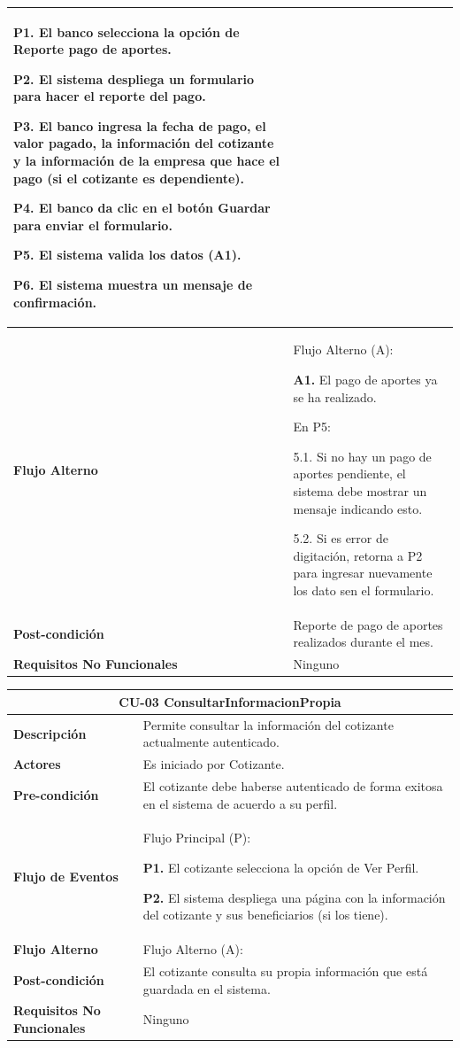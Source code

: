 \documentclass[12pt,a4paper]{article}
\begin{document}
\begin{center}
\begin{tabular}{|m{5.5cm}| m{9.5cm}|}
\textbf{P1.} El banco selecciona la opción de Reporte pago de aportes.

\textbf{P2.} El sistema despliega un formulario para hacer el reporte del pago.

\textbf{P3.} El banco ingresa la fecha de pago, el valor pagado, la información del cotizante y la información de la empresa que hace el pago (si el cotizante es dependiente).

\textbf{P4.} El banco da clic en el botón Guardar para enviar el formulario.

\textbf{P5.} El sistema valida los datos (A1).

\textbf{P6.} El sistema muestra un mensaje de confirmación.
\\
\hline 
\textbf{Flujo Alterno} &  Flujo Alterno (A):

\textbf{A1.} El pago de aportes ya se ha realizado.

	En P5:
	
	5.1. Si no hay un pago de aportes pendiente, el sistema debe mostrar un mensaje indicando esto.
	
	5.2. Si es error de digitación, retorna a P2 para ingresar nuevamente los dato sen el formulario. \\ 
\hline 
\textbf{Post-condición}  & Reporte de pago de aportes realizados durante el mes. \\ 
\hline 
\textbf{Requisitos No Funcionales} & Ninguno \\ 
\hline 
\end{tabular}
\vspace{5mm}

\begin{tabular}{|m{5.5cm}| m{9.5cm}|}
\hline 
\multicolumn{2}{|c|}{\textbf{CU-03 ConsultarInformacionPropia}} \\ 
\hline 
\textbf{Descripción} & Permite consultar la información del cotizante actualmente autenticado. \\ 
\hline 
\textbf{Actores} & Es iniciado por Cotizante. \\ 
\hline 
\textbf{Pre-condición} & El cotizante debe haberse autenticado de forma exitosa en el sistema de acuerdo a su perfil. \\ 
\hline 
\textbf{Flujo de Eventos} & Flujo Principal (P):

\textbf{P1.} El cotizante selecciona la opción de Ver Perfil.

\textbf{P2.} El sistema despliega una página con la información del cotizante y sus beneficiarios (si los tiene).
\\
\hline 
\textbf{Flujo Alterno} &  Flujo Alterno (A):
\\ 
\hline 
\textbf{Post-condición}  & El cotizante consulta su propia información que está guardada en el sistema. \\ 
\hline 
\textbf{Requisitos No Funcionales} & Ninguno \\ 
\hline 
\end{tabular}
\vspace{5mm}


\end{center}
\end{document}
